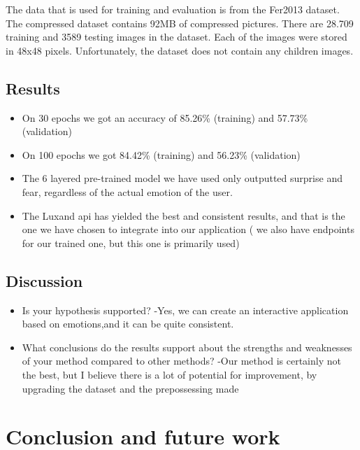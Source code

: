 \documentclass[runningheads,a4paper,11pt]{report}
\begin{document}
The data that is used for training and evaluation is from the Fer2013 dataset. The compressed dataset contains 92MB of compressed pictures. There are 28.709 training and 3589 testing images in the dataset. Each of the images were stored in 48x48 pixels. Unfortunately, the dataset does not contain any children images.

\section{Results}
\label{section:results}

\begin{itemize}
    \item On 30 epochs we got an accuracy of 85.26\% (training) and 57.73\% (validation)
    \item On 100 epochs we got 84.42\% (training) and 56.23\% (validation)
    \item The 6 layered pre-trained model we have used only outputted surprise and fear, regardless of the actual emotion of the user.
    \item The Luxand \gls{api} has yielded the best and consistent results, and that is the one we have chosen to integrate into our application ( we also have endpoints for our trained one, but this one is primarily used)
\end{itemize}
 
\section{Discussion}
\label{section:discussion}

\begin{itemize}
	\item Is your hypothesis supported? 
	\subitem -Yes, we can create an interactive application based on emotions,and it can be quite consistent.
	\item What conclusions do the results support about the strengths and weaknesses of your method compared to other methods? 
	\subitem -Our method is certainly not the best, but I believe there is a lot of potential for improvement, by upgrading the dataset and the prepossessing made
\end{itemize}



\chapter{Conclusion and future work}
\label{chapter:concl}
\end{document}
